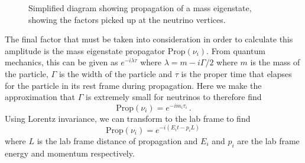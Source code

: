\begin{figure}[h]
  \centering
  \caption[Simplified diagram showing propagation of a mass eigenstate]{Simplified diagram showing propagation of a mass eigenstate, showing the factors picked up at the neutrino vertices.}
  \label{fig:oscillationDiag2}
\end{figure}

The final factor that must be taken into consideration in order to calculate this amplitude is the mass eigenstate propagator $\text{Prop}(\nu_{i})$.
From quantum mechanics, this can be given as $e^{-i \lambda \tau}$ where $\lambda = m - i \Gamma /2$ where $m$ is the mass of the particle, $\Gamma$ is the width of the particle and $\tau$ is the proper time that elapses for the particle in its rest frame during propagation. 
Here we make the approximation that $\Gamma$ is extremely small for neutrinos to therefore find
\begin{equation}
  \text{Prop}(\nu_{i}) = e^{-i m_{i} \tau_{i}} \, .
\end{equation}
Using Lorentz invariance, we can transform to the lab frame to find
\begin{equation}
  \text{Prop}(\nu_{i}) = e^{-i (E_{i}t - p_{i}L) } \, 
\end{equation}
where $L$ is the lab frame distance of propagation and $E_{i}$ and $p_{i}$ are the lab frame energy and momentum respectively.

